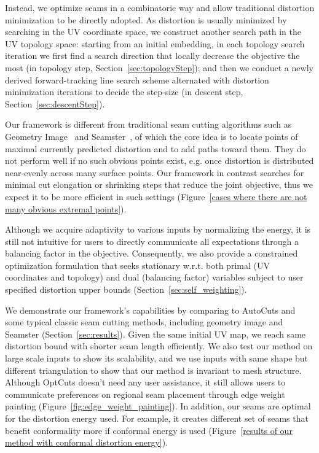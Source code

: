 Instead, we optimize seams in a combinatoric way and allow traditional distortion minimization to be directly adopted. As distortion is usually minimized by searching in the UV coordinate space, we construct another search path in the UV topology space: starting from an initial embedding, in each topology search iteration we first find a search direction that locally decrease the objective the most (in topology step, Section~\ref{sec:topologyStep}); and then we conduct a newly derived forward-tracking line search scheme alternated with distortion minimization iterations to decide the step-size (in descent step, Section~\ref{sec:descentStep}).

Our framework is different from traditional seam cutting algorithms such as Geometry Image~\cite{Gu2002Geometry} and Seamster~\cite{Sheffer2002Seamster}, of which the core idea is to locate points of maximal currently predicted distortion and to add paths toward them. They do not perform well if no such obvious points exist, e.g. once distortion is distributed near-evenly across many surface points. Our framework in contrast searches for minimal cut elongation or shrinking steps that reduce the joint objective, thus we expect it to be more efficient in such settings (Figure~\ref{cases where there are not many obvious extremal points}).

Although we acquire adaptivity to various inputs by normalizing the energy, it is still not intuitive for users to directly communicate all expectations through a balancing factor in the objective. Consequently, we also provide a constrained optimization formulation that seeks stationary w.r.t. both primal (UV coordinates and topology) and dual (balancing factor) variables subject to user specified distortion upper bounds (Section~\ref{sec:self_weighting}).

We demonstrate our framework's capabilities by comparing to AutoCuts and some typical classic seam cutting methods, including geometry image and Seamster (Section~\ref{sec:results}). Given the same initial UV map, we reach same distortion bound with shorter seam length efficiently. We also test our method on large scale inputs to show its scalability, and we use inputs with same shape but different triangulation to show that our method is invariant to mesh structure.
Although OptCuts doesn't need any user assistance, it still allows users to communicate preferences on regional seam placement through edge weight painting (Figure~\ref{fig:edge_weight_painting}).
In addition, our seams are optimal for the distortion energy used. For example, it creates different set of seams that benefit conformality more if conformal energy is used (Figure~\ref{results of our method with conformal distortion energy}).

